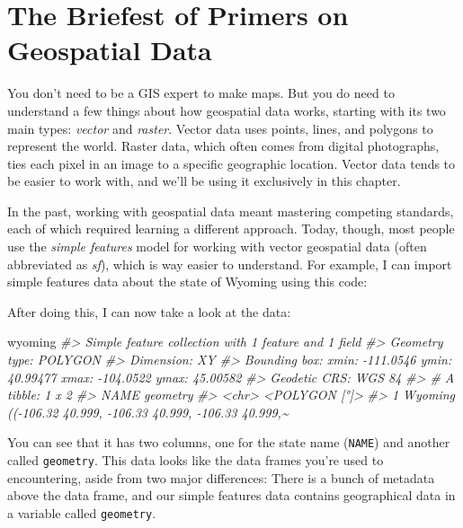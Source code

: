 \documentclass[
]{book}
\newenvironment{Shaded}{\begin{snugshade}}{\end{snugshade}}
\newcommand{\CommentTok}[1]{\textcolor[rgb]{0.56,0.35,0.01}{\textit{#1}}}
\newcommand{\NormalTok}[1]{#1}
\begin{document}
\hypertarget{the-briefest-of-primers-on-geospatial-data}{%
\section*{The Briefest of Primers on Geospatial Data}\label{the-briefest-of-primers-on-geospatial-data}}

You don't need to be a GIS expert to make maps. But you do need to understand a few things about how geospatial data works, starting with its two main types: \emph{vector} and \emph{raster}. Vector data uses points, lines, and polygons to represent the world. Raster data, which often comes from digital photographs, ties each pixel in an image to a specific geographic location. Vector data tends to be easier to work with, and we'll be using it exclusively in this chapter.

In the past, working with geospatial data meant mastering competing standards, each of which required learning a different approach. Today, though, most people use the \emph{simple features} model for working with vector geospatial data (often abbreviated as \emph{sf}), which is way easier to understand. For example, I can import simple features data about the state of Wyoming using this code:

After doing this, I can now take a look at the data:

\begin{Shaded}
\begin{Highlighting}[]
\NormalTok{wyoming}
\CommentTok{\#\textgreater{} Simple feature collection with 1 feature and 1 field}
\CommentTok{\#\textgreater{} Geometry type: POLYGON}
\CommentTok{\#\textgreater{} Dimension:     XY}
\CommentTok{\#\textgreater{} Bounding box:  xmin: {-}111.0546 ymin: 40.99477 xmax: {-}104.0522 ymax: 45.00582}
\CommentTok{\#\textgreater{} Geodetic CRS:  WGS 84}
\CommentTok{\#\textgreater{} \# A tibble: 1 x 2}
\CommentTok{\#\textgreater{}   NAME                                              geometry}
\CommentTok{\#\textgreater{}   \textless{}chr\textgreater{}                                        \textless{}POLYGON [°]\textgreater{}}
\CommentTok{\#\textgreater{} 1 Wyoming (({-}106.32 40.999, {-}106.33 40.999, {-}106.33 40.999,\textasciitilde{}}
\end{Highlighting}
\end{Shaded}

You can see that it has two columns, one for the state name (\texttt{NAME}) and another called \texttt{geometry}. This data looks like the data frames you're used to encountering, aside from two major differences: There is a bunch of metadata above the data frame, and our simple features data contains geographical data in a variable called \texttt{geometry}.
\end{document}
